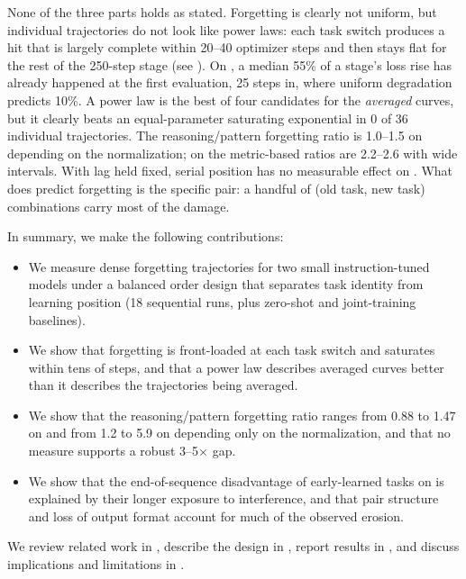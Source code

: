 None of the three parts holds as stated.
Forgetting is clearly not uniform, but individual trajectories do not look like power laws: each task switch produces a hit that is largely complete within 20--40 optimizer steps and then stays flat for the rest of the 250-step stage (see ).
On \llama, a median 55\% of a stage's loss rise has already happened at the first evaluation, 25 steps in, where uniform degradation predicts 10\%.
A power law is the best of four candidates for the \emph{averaged} \llama curves, but it clearly beats an equal-parameter saturating exponential in 0 of 36 individual trajectories.
The reasoning/pattern forgetting ratio is 1.0--1.5 on \llama depending on the normalization; on \qwen the metric-based ratios are 2.2--2.6 with wide intervals.
With lag held fixed, serial position has no measurable effect on \llama.
What does predict forgetting is the specific pair: a handful of (old task, new task) combinations carry most of the damage.

In summary, we make the following contributions:
\begin{itemize}[leftmargin=*,itemsep=0pt,topsep=0pt]
    \item We measure dense forgetting trajectories for two small instruction-tuned models under a balanced order design that separates task identity from learning position (18 sequential runs, plus zero-shot and joint-training baselines).
    \item We show that forgetting is front-loaded at each task switch and saturates within tens of steps, and that a power law describes averaged curves better than it describes the trajectories being averaged.
    \item We show that the reasoning/pattern forgetting ratio ranges from 0.88 to 1.47 on \llama and from 1.2 to 5.9 on \qwen depending only on the normalization, and that no measure supports a robust 3--5$\times$ gap.
    \item We show that the end-of-sequence disadvantage of early-learned tasks on \llama is explained by their longer exposure to interference, and that pair structure and loss of output format account for much of the observed erosion.
\end{itemize}

We review related work in , describe the design in , report results in , and discuss implications and limitations in .
